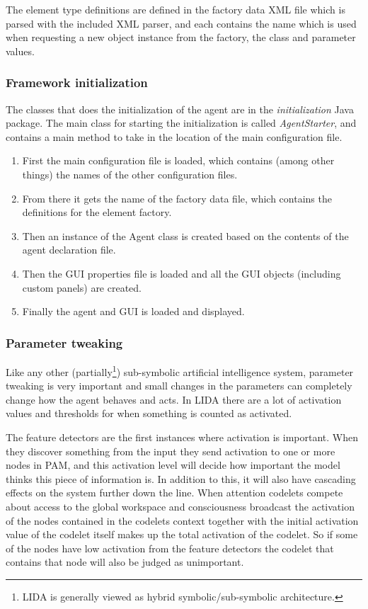 The element type definitions are defined in the factory data  XML file which is parsed with the included XML parser, and each contains the name which is used when requesting a new object instance from the factory, the class and parameter values.

\subsubsection{Framework initialization}
The classes that does the initialization of the agent are in the {\em initialization} Java package. The main class for starting the initialization is called {\em AgentStarter}, and contains a main method to take in the location of the main configuration file.

\begin{enumerate}
 \item First the main configuration file is loaded, which contains (among other things) the names of the other configuration files.
 \item From there it gets the name of the factory data file, which contains the definitions for the element factory.
 \item Then an instance of the Agent class is created based on the contents of the agent declaration file.
 \item Then the GUI properties file is loaded and all the GUI objects (including custom panels) are created.
 \item Finally the agent and GUI is loaded and displayed.
\end{enumerate}

\subsubsection{Parameter tweaking}
Like any other (partially\footnote{LIDA is generally viewed as hybrid symbolic/sub-symbolic architecture.\cite{duch2008cognitive}}) sub-symbolic artificial intelligence system, parameter tweaking is very important and small changes in the parameters can completely change how the agent behaves and acts. In LIDA there are a lot of activation values and thresholds for when something is counted as activated. 

The feature detectors are the first instances where activation is important. When they discover something from the input they send activation to one or more nodes in PAM, and this activation level will decide how important the model thinks this piece of information is. In addition to this, it will also have cascading effects on the system further down the line. When attention codelets compete about access to the global workspace and consciousness broadcast the activation of the nodes contained in the codelets context together with the initial activation value of the codelet itself makes up the total activation of the codelet. So if some of the nodes have low activation from the feature detectors the codelet that contains that node will also be judged as unimportant. 

